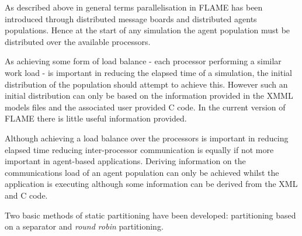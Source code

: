 As described above in general terms parallelisation in FLAME has been introduced through distributed message boards and distributed agents populations. Hence at the start of any simulation the agent population must be distributed over the available processors.

As achieving some form of load balance - each processor performing a similar work load - is important in reducing the elapsed time of a simulation, the initial distribution of the population should attempt to achieve this. However such an initial distribution can only be based on the information provided in the XMML models files and the associated user provided C code. In the current version of FLAME there is little useful information provided.

Although achieving a load balance over the processors is important in reducing elapsed time reducing inter-processor communication is equally if not more important in agent-based applications. Deriving information on the communications load of an agent population can only be achieved whilst the application is executing although some information can be derived from the XML and C code.

Two basic methods of static partitioning have been developed: partitioning based on a separator and \textsl{round robin} partitioning.